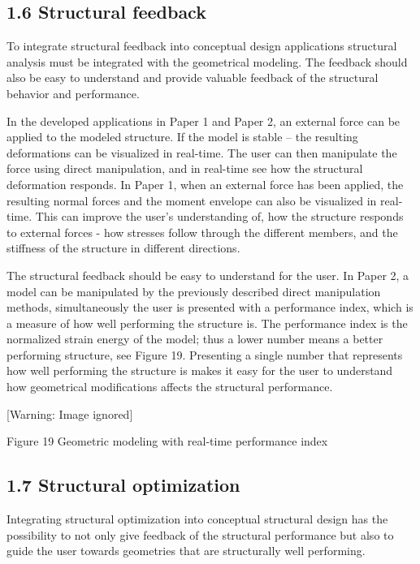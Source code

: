 \subsection[1.6 Structural feedback]{1.6 Structural feedback}
To integrate structural feedback into conceptual design applications structural analysis must be integrated with the geometrical modeling. The feedback should also be easy to understand and provide valuable feedback of the structural behavior and performance.

In the developed applications in Paper 1 and Paper 2, an external force can be applied to the modeled structure. If the model is stable – the resulting deformations can be visualized in real-time. The user can then manipulate the force using direct manipulation, and in real-time see how the structural deformation responds. In Paper 1, when an external force has been applied, the resulting normal forces and the moment envelope can also be visualized in real-time. This can improve the user’s understanding of, how the structure responds to external forces - how stresses follow through the different members, and the stiffness of the structure in different directions.



The structural feedback should be easy to understand for the user. In Paper 2, a model can be manipulated by the previously described direct manipulation methods, simultaneously the user is presented with a performance index, which is a measure of how well performing the structure is. The performance index is the normalized strain energy of the model; thus a lower number means a better performing structure, see Figure 19. Presenting a single number that represents how well performing the structure is makes it easy for the user to understand how geometrical modifications affects the structural performance.



  [Warning: Image ignored] %
 

Figure 19 Geometric modeling with real-time performance index

\subsection[1.7 Structural optimization]{1.7 Structural optimization}
Integrating structural optimization into conceptual structural design has the possibility to not only give feedback of the structural performance but also to guide the user towards geometries that are structurally well performing. 



